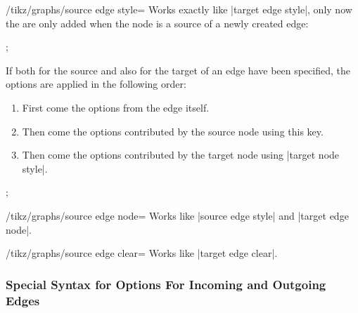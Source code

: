 \begin{key}{/tikz/graphs/source edge style=}
  Works exactly like |target edge style|, only now the 
  are only added when the node is a source of a newly created edge:
\begin{codeexample}[]
\tikz {};
\end{codeexample}
  If both for the source and also for the target of an edge
   have been specified, the options are applied in the
  following order:
  \begin{enumerate}
  \item First come the options from the edge itself.
  \item Then come the options contributed by the source node using
    this key.
  \item Then come the options contributed by the target node using
    |target node style|.    
  \end{enumerate}
\begin{codeexample}[]
\tikz {};
\end{codeexample}
\end{key}

\begin{key}{/tikz/graphs/source edge node=}
  Works like |source edge style| and |target edge node|.  
\end{key}

\begin{key}{/tikz/graphs/source edge clear=}
  Works like |target edge clear|.  
\end{key}



\subsubsection{Special Syntax for Options For Incoming and Outgoing Edges}
\label{section-syntax-outgoing-incoming}

